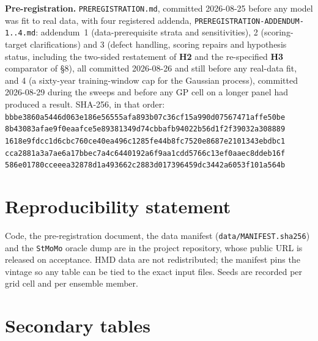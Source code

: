\documentclass[11pt,a4paper]{article}
\newcommand{\Htwo}{\textbf{H2}}
\newcommand{\Hthree}{\textbf{H3}}
\newcommand{\pkg}[1]{\texttt{#1}}
\theoremstyle{definition}
\begin{document}
\vspace{0.5em}
\noindent\textbf{Pre-registration.} \texttt{PREREGISTRATION.md}, committed
2026-08-25 before any model was fit to real data, with four registered
addenda, \texttt{PREREGISTRATION-ADDENDUM-1..4.md}: addendum~1
(data-prerequisite strata and sensitivities), 2 (scoring-target
clarifications) and 3 (defect handling, scoring repairs and hypothesis
status, including the two-sided restatement of \Htwo{} and the re-specified
\Hthree{} comparator of \S8), all committed 2026-08-26 and still before any
real-data fit, and 4 (a sixty-year training-window cap for the Gaussian
process), committed 2026-08-29 during the sweeps and before any GP cell on a
longer panel had produced a result. SHA-256, in that order:\\
\texttt{\small bbbe3860a5446d063e186e56555afa893b07c36cf15a990d07567471affe50be}\\
\texttt{\small 8b43083afae9f0eaafce5e89381349d74cbbafb94022b56d1f2f39032a308889}\\
\texttt{\small 1618e9fdcc1d6cbc760ce40ea496c1285fe44b8fc7520e8687e2101343ebdbc1}\\
\texttt{\small cca2881a3a7ae6a17bbec7a4c6440192a6f9aa1cdd5766c13ef0aaec8ddeb16f}\\
\texttt{\small 586e01780cceeea32878d1a493662c2883d017396459dc3442a6053f101a564b}











\section*{Reproducibility statement}
Code, the pre-registration document, the data manifest
(\texttt{data/MANIFEST.sha256}) and the \pkg{StMoMo} oracle dump are in the
project repository, whose public URL is released on acceptance. HMD data are not
redistributed; the manifest pins the vintage so any table can be tied to the
exact input files. Seeds are recorded per grid cell and per ensemble member.

\appendix
\section{Secondary tables}
\label{app:secondary}
\end{document}
